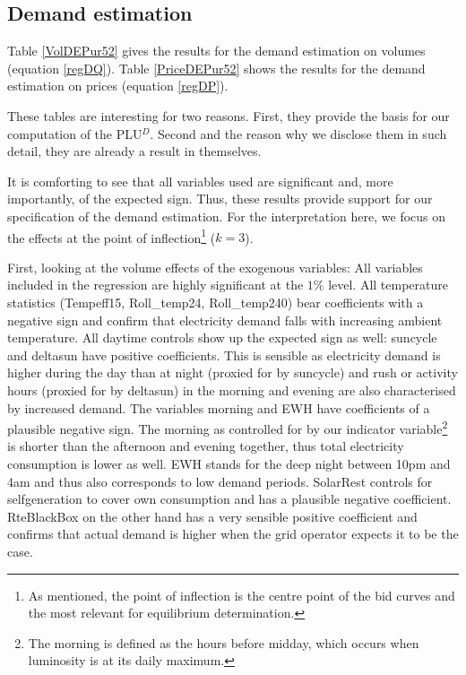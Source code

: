 \subsection{Demand estimation}
Table \ref{VolDEPur52} gives the results for the demand estimation on volumes (equation \ref{regDQ}). Table \ref{PriceDEPur52} shows the results for the demand estimation on prices (equation \ref{regDP}). 

These tables are interesting for two reasons. First, they provide the basis for our computation of the PLU$^D$. Second and the reason why we disclose them in such detail, they are already a result in themselves. 

It is comforting to see that all variables used are significant and, more importantly, of the expected sign. Thus, these results provide  support for our specification of the demand estimation. 
For the interpretation here, we focus on the effects at the point of inflection\footnote{As mentioned, the point of inflection is the centre point of the bid curves and the most relevant for equilibrium determination. %
} ($k=3$). 

First, looking at the volume effects of the exogenous variables: 
All variables included in the regression are highly significant at the $1\%$ level.
All temperature statistics (Tempeff15, Roll\_temp24, Roll\_temp240) bear coefficients with a negative sign and confirm that electricity demand falls with increasing ambient temperature.  All daytime controls show up the expected sign as well: suncycle and deltasun have positive coefficients. This is sensible as electricity demand is higher during the day than at night (proxied for by suncycle) and rush or activity hours (proxied for by deltasun) in the morning and evening are also characterised by increased demand. The variables morning and EWH have coefficients of a plausible negative sign. The morning as controlled for by our indicator variable\footnote{The morning is defined as the hours before midday, which occurs when luminosity is at its daily maximum.} is shorter than the afternoon and evening together, thus total electricity consumption is lower as well. EWH stands for the deep night between 10pm and 4am and thus also corresponds to low demand periods. SolarRest controls for selfgeneration to cover own consumption and has a plausible negative coefficient. RteBlackBox on the other hand has a very sensible positive coefficient and confirms that actual demand is higher when the grid operator expects it to be the case. 

